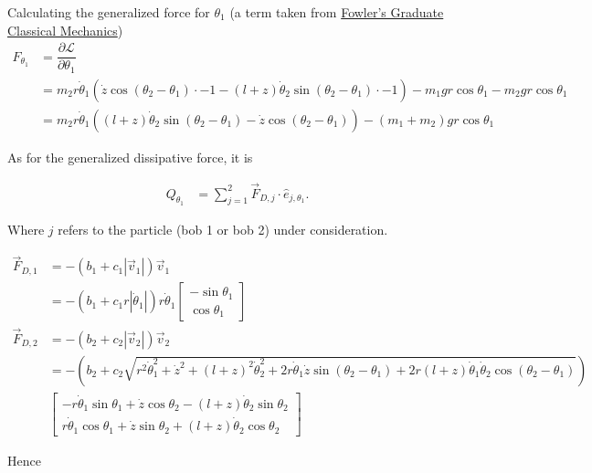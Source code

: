 \documentclass[12pt,a4paper,portrait]{article}
\newcommand{\lag}{\mathcal{L}}
\begin{document}
\begin{landscape}
Calculating the generalized force for $\theta_1$ (a term taken from \href{https://phys.libretexts.org/Bookshelves/Classical_Mechanics/Graduate_Classical_Mechanics_(Fowler)/04%3A_Hamilton's_Principle_and_Noether's_Theorem/4.05%3A_Generalized_Momenta_and_Forces}{Fowler's Graduate Classical Mechanics})
\begin{align*}
	 F_{\theta_1} &= \dfrac{\partial \lag}{\partial \theta_1} \\
	 &= m_2 r \dot{\theta}_1(\dot{z}\cos{(\theta_2-\theta_1)}\cdot -1 -(l+z)\dot{\theta}_2 \sin{(\theta_2-\theta_1)}\cdot -1) - m_1gr \cos{\theta_1} - m_2gr\cos{\theta_1} \\
	 &= m_2 r\dot{\theta}_1((l+z)\dot{\theta}_2 \sin{(\theta_2-\theta_1)}-\dot{z}\cos{(\theta_2-\theta_1)}) -(m_1+m_2)gr\cos{\theta_1}
\end{align*}

As for the generalized dissipative force, it is

\begin{align*}
	Q_{\theta_1} &= \sum_{j=1}^2 \vec{F}_{D,j} \cdot \hat{e}_{j, \theta_1}.
\end{align*}

Where $j$ refers to the particle (bob 1 or bob 2) under consideration. 

\begin{align*}
	\vec{F}_{D, 1} &= -(b_1+c_1|\vec{v}_1|)\vec{v}_1 \\
	&= -(b_1+c_1r|\dot{\theta}_1|)r\dot{\theta}_1 \begin{bmatrix}
		-\sin{\theta}_1 \\
		\cos{\theta}_1
	\end{bmatrix} \\
	\vec{F}_{D, 2} &= -(b_2+c_2|\vec{v}_2|)\vec{v}_2 \\
	&= -\left(b_2+c_2\sqrt{r^2 \dot{\theta}_1^2 + \dot{z}^2 + (l+z)^2\dot{\theta}_2^2 + 2r\dot{\theta}_1 \dot{z} \sin{(\theta_2-\theta_1)} + 2r(l+z)\dot{\theta}_1\dot{\theta}_2\cos{(\theta_2 - \theta_1)}}\right)\\
	&\begin{bmatrix}
		-r \dot{\theta}_1 \sin{\theta_1} + \dot{z} \cos{\theta_2}-(l+z)\dot{\theta}_2 \sin{\theta_2} \\
		r \dot{\theta}_1 \cos{\theta_1} + \dot{z} \sin{\theta_2}+(l+z)\dot{\theta}_2 \cos{\theta_2}
	\end{bmatrix}
\end{align*}

Hence


\end{landscape}
\end{document}
